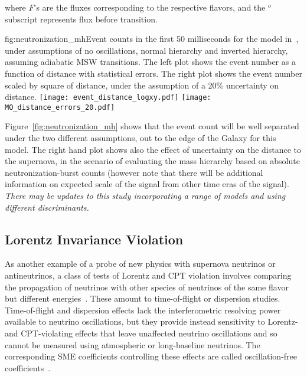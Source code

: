where $F$'s are the fluxes corresponding to the respective flavors,
and the $^o$ subscript represents flux before transition.

\begin{dunefigure}[MH1]{fig:neutronization_mh}{Event counts in the
    first 50 milliseconds for the model in~\cite{Huedepohl}, under
    assumptions of no oscillations, normal hierarchy and inverted
    hierarchy, assuming adiabatic MSW transitions.  The left plot
    shows the event number as a function of distance with statistical
    errors.  The right plot
    shows the event number scaled by square of distance, under the
    assumption of a 20\% uncertainty on distance. }
\texttt{[image: event\_distance\_logxy.pdf]}
\texttt{[image: MO\_distance\_errors\_20.pdf]}
\end{dunefigure}

Figure~\ref{fig:neutronization_mh} shows that the event count will be
well separated under the two different assumptions, out to the edge of
the Galaxy for this model.  The right hand plot shows also the effect of uncertainty
on the distance to the supernova, in the scenario of evaluating the
mass hierarchy based on absolute neutronization-burst counts (however
note that there will be additional information on expected scale of
the signal from other time eras of the signal). \textit{There may be
  updates to this study incorporating a range of models and using
  different discriminants.}


\subsection{Lorentz Invariance Violation}

As another example of a probe of new physics with supernova neutrinos or antineutrinos,
a class of tests of Lorentz and CPT violation involves comparing the propagation of neutrinos with other species of neutrinos of the same flavor but different energies~\cite{Kostelecky:2003cr,Kostelecky:2003xn,Kostelecky:2011gq,Diaz:2009qk}. These amount to time-of-flight or dispersion studies.
Time-of-flight and dispersion effects lack the interferometric resolving power available to neutrino oscillations, but they provide instead sensitivity to Lorentz- and CPT-violating effects that  leave unaffected neutrino oscillations
and so cannot be measured using atmospheric or long-baseline neutrinos.
The corresponding SME coefficients controlling these effects are called oscillation-free coefficients~\cite{Kostelecky:2011gq}.

